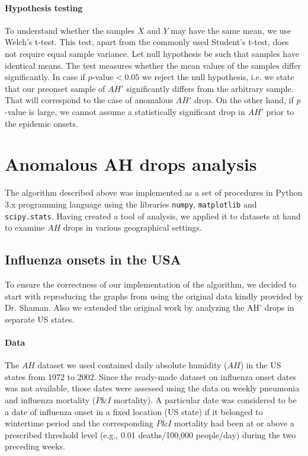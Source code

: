 \documentclass[3p,times,procedia]{elsarticle}
\begin{document}
\paragraph{Hypothesis testing}
To understand whether the samples $X$ and $Y$ may have the same mean, we use Welch's t-test. This test, apart from the commonly used Student's t-test, does not require equal sample variance. Let null hypothesis be such that samples have identical means. The test measures whether the mean values of the samples differ significantly. In case if $p$-value$<0.05$ we reject the null hypothesis, i.e. we state that our preonset sample of $AH'$ significantly differs from the arbitrary sample. That will correspond to the case of anomalous $AH'$ drop. On the other hand, if $p$-value is large, we cannot assume a statistically significant drop in $AH'$ prior to the epidemic onsets.


\section{Anomalous AH drops analysis}

The algorithm described above was implemented as a set of procedures in Python 3.x programming language using the libraries \texttt{numpy}, \texttt{matplotlib} and \texttt{scipy.stats}. Having created a tool of analysis, we applied it to datasets at hand to examine $AH$ drops in various geographical settings.

\subsection{Influenza onsets in the USA} \label{sect:usa}

To ensure the correctness of our implementation of the algorithm, we decided to start with reproducing the graphs from \cite{shaman2010absolute} using the original data kindly provided by Dr. Shaman. Also we extended the original work by analyzing the AH' drops in separate US states.

\paragraph{Data}

The $AH$ dataset we used contained daily absolute humidity ($AH$) in the US states from 1972 to 2002. Since the ready-made dataset on influenza onset dates was not available, those dates were assessed using the data on weekly pneumonia and influenza mortality ($P\&I$ mortality). A particular date was considered to be a date of influenza onset in a fixed location (US state) if it belonged to wintertime period and the corresponding $P\&I$ mortality had been at or above a prescribed threshold level (e.g., 0.01 deaths/100,000 people/day) during the two preceding weeks.
\end{document}
